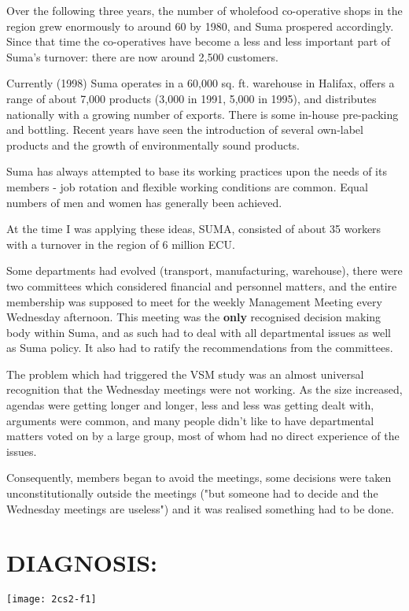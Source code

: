 Over the following three years, the number of wholefood co-operative shops in the region grew enormously to around 60 by 1980, and Suma prospered accordingly.
Since that time the co-operatives have become a less and less important part of Suma's turnover: there are now around 2,500 customers.

Currently (1998) Suma operates in a 60,000 sq. ft. warehouse in Halifax, offers a range of about 7,000 products (3,000 in 1991, 5,000 in 1995), and distributes nationally with a growing number of exports. There is some in-house pre-packing and bottling. Recent years have seen the introduction of several own-label products and the growth of environmentally sound products.

Suma has always attempted to base its working practices upon the needs of its members - job rotation and flexible working conditions are common. Equal numbers of men and women has generally been achieved.

At the time I was applying these ideas, SUMA, consisted of about 35 workers with a turnover in the region of 6 million ECU.

Some departments had evolved (transport, manufacturing, warehouse), there were two committees which considered financial and personnel matters, and the entire membership was supposed to meet for the weekly Management Meeting every Wednesday afternoon. This meeting was the \textbf{only} recognised decision making body within Suma, and as such had to deal with all departmental issues as well as Suma policy. It also had to ratify the recommendations from the committees.

The problem which had triggered the VSM study was an almost universal recognition that the Wednesday meetings were not working. As the size increased, agendas were getting longer and longer, less and less was getting dealt with, arguments were common, and many people didn't like to have departmental matters voted on by a large group, most of whom had no direct experience of the issues.

Consequently, members began to avoid the meetings, some decisions were taken unconstitutionally outside the meetings ("but someone had to decide and the Wednesday meetings are useless") and it was realised something had to be done.

\section*{DIAGNOSIS:}
\begin{center}
\texttt{[image: 2cs2-f1]}
\end{center}

